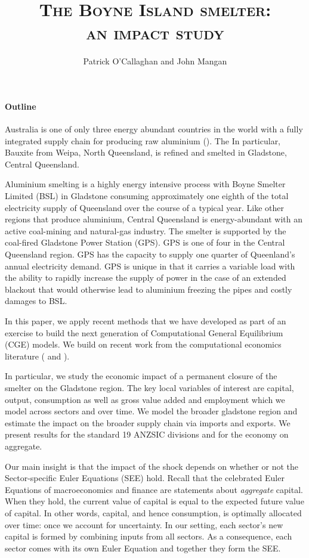 \documentclass[12pt,a4paper]{article}
\title{\textsc{The Boyne Island smelter:\\
  an impact study}}
\author{\small Patrick O’Callaghan and John Mangan}
\begin{document}
\maketitle


\paragraph{Outline} Australia is one of only three energy abundant countries in
the world with a fully integrated supply chain for producing raw aluminium
(\cite{GN-Aluminium-smelters}). The In particular, Bauxite from Weipa, North
Queensland, is refined and smelted in Gladstone, Central Queensland.

Aluminium smelting is a highly energy intensive process with Boyne Smelter
Limited (BSL) in Gladstone consuming approximately one eighth of the total
electricity supply of Queensland over the course of a typical year. Like other
regions that produce aluminium, Central Queensland is energy-abundant with an
active coal-mining and natural-gas industry. The smelter is supported by the
coal-fired Gladstone Power Station (GPS). GPS is one of four in the Central
Queensland region. GPS has the capacity to supply one quarter of Queenland's
annual electricity demand. GPS is unique in that it carries a variable load
with the ability to rapidly increase the supply of power in the case of an
extended blackout that would otherwise lead to aluminium freezing the pipes and
costly damages to BSL.

In this paper, we apply recent methods that we have developed as part of an
exercise to build the next generation of Computational General Equilibrium
(CGE) models.  We build on recent work from the computational economics
literature (\cite{CJ} and \cite{Atalay}).

In particular, we study the economic impact of a permanent closure of the
smelter on the Gladstone region. The key local variables of interest are
capital, output, consumption as well as gross value added and employment which
we model across sectors and over time. We model the broader gladstone region
and estimate the impact on the broader supply chain via imports and exports. We
present results for the standard 19 ANZSIC divisions and for the economy on
aggregate.

Our main insight is that the impact of the shock depends on whether or not the
Sector-specific Euler Equations (SEE) hold. Recall that the celebrated Euler
Equations of macroeconomics and finance are statements about \emph{aggregate}
capital.  When they hold, the current value of capital is equal to the expected
future value of capital. In other words, capital, and hence consumption, is
optimally allocated over time: once we account for uncertainty. In our setting,
each sector's new capital is formed by combining inputs from all sectors. As a
consequence, each sector comes with its own Euler Equation and together they
form the SEE.
\end{document}
